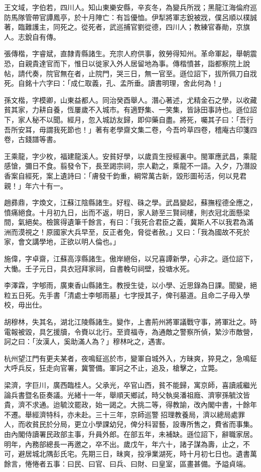 \begin{pinyinscope}
王文域，字伯若，四川人。知山東樂安縣，辛亥冬，為變兵所戕；黑龍江海倫府巡防馬隊管帶官譚鳳亭，於十月陣亡：有旨優恤。伊犁將軍志銳被戕，僕呂順以樸誠著，臨難護主，同死之。從死者，武巡捕官劉從德，四川人；教練官春勛，京旗人。志銳自有傳。

張傳楷，字睿斌，直隸青縣諸生。充宗人府供事，敘勞得知州。革命軍起，舉朝震恐，自親貴達官而下，惟日以徙家入外人居留地為事。傳楷憤甚，詣都察院上說帖，請代奏，院官無在者，止院門，哭三日，無一官至。遜位詔下，拔所佩刀自戕死。自銘十六字曰：「成仁取義，孔、孟所垂。讀書明理，舍此何為！」

孫文楷，字模卿，山東益都人。同治癸酉舉人。潛心著述，尤精金石之學，以收藏貧其家，力耕自養，恆屢歲不入城市。有適野集、一笑集，皆詠田事詩也。遜位詔下，家人秘不以聞。經月，忽入城訪友歸，即仰藥自盡。將死，囑其子曰：「吾行吾所安耳，毋謂我死節也！」著有老學齋文集二卷，今吾吟草四卷，稽庵古印箋四卷，古錢譜等書。

王乘龍，字少枚，福建龍溪人。安貧好學，以歲貢生授經裏中。閩軍應武昌，乘龍感愴，彌日不食。翦發令下，長至謁宗祠，宗人勸之，乘龍不一語。入夕，乃潛設香案自經死，案上遺詩曰：「膚發千鈞重，綱常萬古新，毀形圖茍活，何以見君親！」年六十有一。

趙彞鼎，字煥文，江蘇江陰縣諸生。好程、硃之學。武昌變起，蘇撫程德全應之，憤痛絕食。十月初九日，出而不返，明日，家人跡至三賢祠樓，則衣冠北面懸梁間，氣絕矣。檢篋得遺筆千餘言，有曰：「我死合君臣之義，冀斯人不以我君為滿洲而漠視之！原國家大兵早至，反正者免，脅從者赦。」又曰：「我為國故不死於家，會文講學地，正欲以明人倫也。」

施偉，字卓齋，江蘇高淳縣諸生。傲岸絕俗，以兄喜譚新學，心非之。遜位詔下，大慟。壬子元日，具衣冠拜家祠，自書輓句祠壁，投塘水死。

李澤霖，字郇雨，廣東香山縣諸生。教授生徒，以小學、近思錄為日課。聞變，絕粒五日死。先手書「清處士李郇雨墓」七字授其子，俾刊墓道。且命二子毋入學校，毋出仕。

胡穆林，失其名，湖北江陵縣諸生。變作，上書荊州將軍議戰守事，將軍壯之。時電報被毀，具乞援牘，令賚以北行。至資福寺，為通敵之警察所偵，縶沙市敵營，訶之曰：「汝漢人，奚助滿人為？」穆林叱之，遇害。

杭州望江門有更夫某者，夜鳴鉦巡於市，變軍自城外入，方昧爽，猝見之，急鳴鉦大呼兵反，狂走向官署，冀警備。軍訶之不止，追及，槍擊之，立斃。

梁濟，字巨川，廣西臨桂人。父承光，卒官山西，貧不能歸，寓京師，喜讀戚繼光論兵書暨名臣奏議。光緒十一年，舉順天鄉試，時父執吳潘祖廕、濟寧孫毓汶皆貴，濟不求通。迨毓汶罷政，始一謁之。大挑二等，得教諭，改內閣中書，十餘年不遷。舉經濟特科，亦未赴。三十三年，京師巡警招理教養局，濟以總局處罪人，而收貧民於分局，更立小學課幼兒，俾分科習藝，設專所售之，費省而事集。由內閣侍讀署民政部主事，升員外郎。在部五年，未補缺。遜位詔下，辭職家居。明年，內務部總長一再邀之，卒不出。歲戊午，年六十，諸子謀為壽，止之，不可，避居城北隅彭氏宅。先期三日，昧爽，投凈業湖死，時十月初七日也。遺書萬餘言，惓惓者五事：曰民、曰官、曰兵、曰財、曰皇室，區畫甚備。予謚貞端。


\end{pinyinscope}
